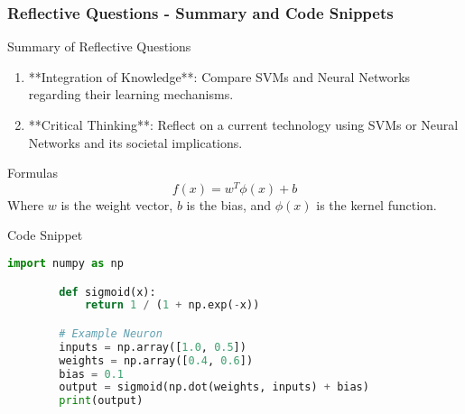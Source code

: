 \documentclass[aspectratio=169]{beamer}
\begin{document}
\begin{frame}[fragile]
    \frametitle{Reflective Questions - Summary and Code Snippets}
    \begin{block}{Summary of Reflective Questions}
        \begin{enumerate}
            \item **Integration of Knowledge**: Compare SVMs and Neural Networks regarding their learning mechanisms.
            \item **Critical Thinking**: Reflect on a current technology using SVMs or Neural Networks and its societal implications.
        \end{enumerate}
    \end{block}
    \begin{block}{Formulas}
        \begin{equation}
            f(x) = w^T \phi(x) + b
        \end{equation}
        Where \( w \) is the weight vector, \( b \) is the bias, and \( \phi(x) \) is the kernel function.
    \end{block}
    \begin{block}{Code Snippet}
        \begin{lstlisting}[language=Python]
        import numpy as np

        def sigmoid(x):
            return 1 / (1 + np.exp(-x))

        # Example Neuron
        inputs = np.array([1.0, 0.5])
        weights = np.array([0.4, 0.6])
        bias = 0.1
        output = sigmoid(np.dot(weights, inputs) + bias)
        print(output)
        \end{lstlisting}
    \end{block}
\end{frame}
\end{document}
